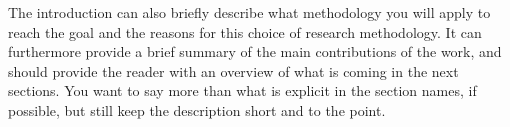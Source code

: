 The introduction can also briefly describe what methodology you will apply to reach the goal and the reasons for this choice of research methodology.  
It can furthermore provide a brief summary of the main contributions of the work,
and should provide the reader with an overview of what is coming in the next sections. 
You want to say more than what is explicit in the section names, if possible, but still keep the description short and to the point. 
